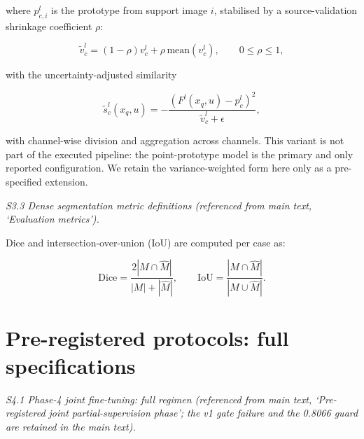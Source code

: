 \documentclass[11pt]{article}
\begin{document}
where $p_{c,i}^l$ is the prototype from support image $i$, stabilised by a
source-validation shrinkage coefficient $\rho$:

\begin{equation}
  \tilde v_c^l
  =(1-\rho)v_c^l+\rho\,\mathrm{mean}(v_c^l),
  \qquad 0\leq\rho\leq1,
  \label{eq:variance_shrinkage}
\end{equation}

with the uncertainty-adjusted similarity

\begin{equation}
  \tilde s_c^l(x_q,u)
  =-
  \frac{\left(F^l(x_q,u)-p_c^l\right)^2}
       {\tilde v_c^l+\epsilon},
  \label{eq:uncertain_similarity}
\end{equation}

with channel-wise division and aggregation across channels. This variant is
not part of the executed pipeline: the point-prototype model is the primary
and only reported configuration. We retain the variance-weighted form here
only as a pre-specified extension.


\noindent\emph{S3.3 Dense segmentation metric definitions (referenced from main text, `Evaluation metrics').}

Dice and intersection-over-union (IoU) are computed per case as:

\begin{equation}
  \mathrm{Dice}
  =\frac{2|M\cap\hat M|}{|M|+|\hat M|},
  \qquad
  \mathrm{IoU}
  =\frac{|M\cap\hat M|}{|M\cup\hat M|}.
  \label{eq:dice_iou_metric}
\end{equation}

\section{Pre-registered protocols: full specifications}\label{sm:protocols}

\noindent\emph{S4.1 Phase-4 joint fine-tuning: full regimen (referenced from main text, `Pre-registered joint partial-supervision phase'; the v1 gate failure and the 0.8066 guard are retained in the main text).}
\end{document}
